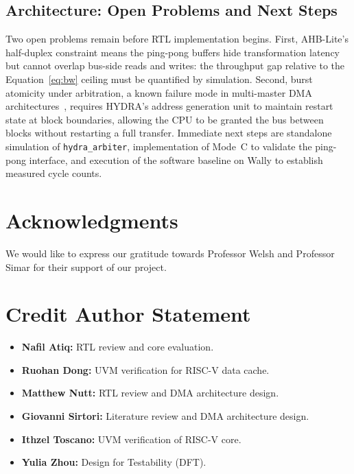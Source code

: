 \documentclass[conference]{IEEEtran}
\begin{document}
\subsection{Architecture: Open Problems and Next Steps}
Two open problems remain before RTL implementation begins. First, AHB-Lite's half-duplex constraint means the ping-pong buffers hide transformation latency but cannot overlap bus-side reads and writes: the throughput gap relative to the Equation~\ref{eq:bw} ceiling must be quantified by simulation. Second, burst atomicity under arbitration, a known failure mode in multi-master DMA architectures~\cite{ti_edma}, requires HYDRA's address generation unit to maintain restart state at block boundaries, allowing the CPU to be granted the bus between blocks without restarting a full transfer. Immediate next steps are standalone simulation of \texttt{hydra\_arbiter}, implementation of Mode~C to validate the ping-pong interface, and execution of the software baseline on Wally to establish measured cycle counts.




\section{Acknowledgments}
We would like to express our gratitude towards Professor Welsh and Professor Simar for their support of our project.

\section{Credit Author Statement}
\begin{itemize}
    \item \textbf{Nafil Atiq:} RTL review and core evaluation. %
    \item \textbf{Ruohan Dong:} UVM verification for RISC-V data cache.
    \item \textbf{Matthew Nutt:} RTL review and DMA architecture design.
    \item \textbf{Giovanni Sirtori:} Literature review and DMA architecture design.
    \item \textbf{Ithzel Toscano:} UVM verification of RISC-V core.
    \item \textbf{Yulia Zhou:} Design for Testability (DFT).
\end{itemize}
\end{document}
